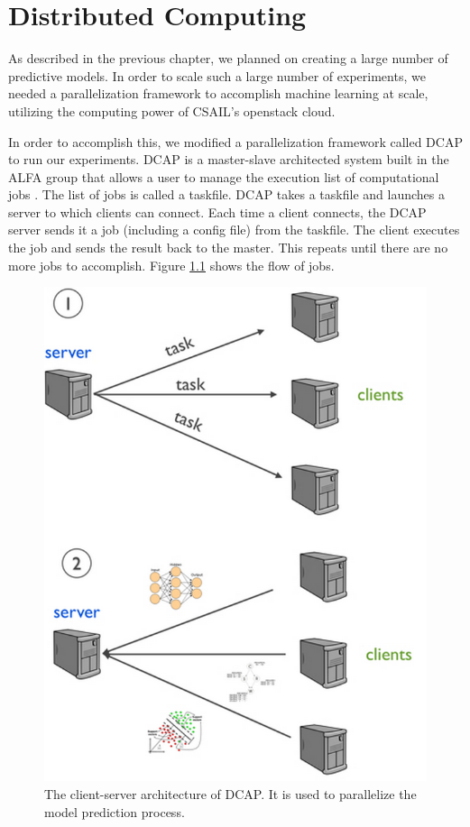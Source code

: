 \chapter{Distributed Computing}\label{chap:dcap} 
As described in the previous chapter, we planned on creating a large number of predictive models. In order to scale such a large number of experiments, we needed a parallelization framework to accomplish machine learning at scale, utilizing the computing power of CSAIL's openstack cloud.

In order to accomplish this, we modified a parallelization framework called DCAP to run our experiments. DCAP is a master-slave architected system built in the ALFA group that allows a user to manage the execution list of computational jobs \cite{alex}. The list of jobs is called a taskfile. DCAP takes a taskfile and launches a server to which clients can connect. Each time a client connects, the DCAP server sends it a job (including a config file) from the taskfile. The client executes the job and sends the result back to the master. This repeats until there are no more jobs to accomplish. Figure \ref{fig:dcap} shows the flow of jobs.

\begin{figure}[ht!]
  \caption{The client-server architecture of DCAP. It is used to parallelize the model prediction process.}\label{fig:dcap}
  \centering
    \includegraphics[width=1.0\textwidth]{figures/dcap.png}
\end{figure}

